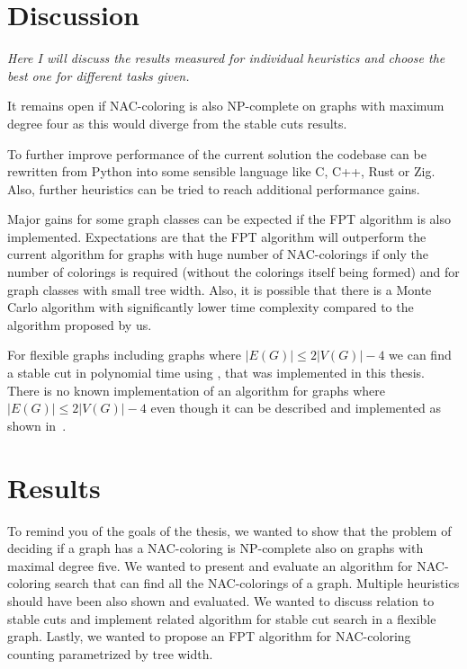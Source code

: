 
\chapter{Discussion}


\emph{Here I will discuss the results measured for individual heuristics
	and choose the best one for different tasks given.}

It remains open if NAC-coloring is also NP-complete on graphs with
maximum degree four as this would diverge from the stable cuts results.

To further improve performance of the current solution the codebase
can be rewritten from Python into some sensible language like C, C++, Rust or Zig.
Also, further heuristics can be tried to reach additional performance  gains.

Major gains for some graph classes
can be expected if the FPT algorithm is also implemented.
Expectations are that the FPT algorithm will outperform the current algorithm
for graphs with huge number of NAC-colorings if only the number of colorings
is required (without the colorings itself being formed) and
for graph classes with small tree width.
Also, it is possible that there is a Monte Carlo algorithm with significantly
lower time complexity compared to the algorithm proposed by us.

For flexible graphs including graphs where \( |E(G)| \le 2|V(G)| - 4 \)
we can find a stable cut in polynomial time using ,
that was implemented in this thesis.
There is no known implementation of an algorithm
for graphs where \( |E(G)| \le 2|V(G)| - 4 \)
even though it can be described and implemented
as shown in~\cite{stable_cuts_2v_3,stable_cuts_2v_3_revisit}.

\chapter{Results}

To remind you of the goals of the thesis,
we wanted to show that the problem of deciding if a graph has a NAC-coloring
is NP-complete also on graphs with maximal degree five.
We wanted to present and evaluate an algorithm for NAC-coloring search
that can find all the NAC-colorings of a graph.
Multiple heuristics should have been also shown and evaluated.
We wanted to discuss relation to stable cuts and implement related algorithm
for stable cut search in a flexible graph.
Lastly, we wanted to propose an FPT algorithm for NAC-coloring counting
parametrized by tree width.

